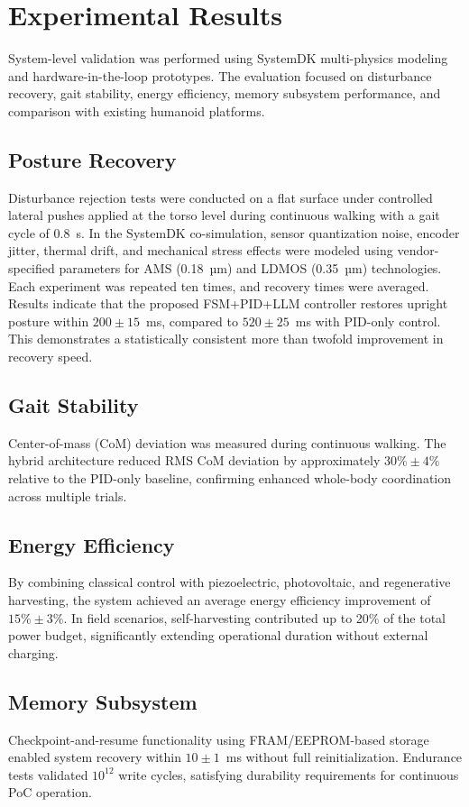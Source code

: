 \section{Experimental Results}
System-level validation was performed using SystemDK multi-physics modeling
and hardware-in-the-loop prototypes. The evaluation focused on disturbance recovery,
gait stability, energy efficiency, memory subsystem performance, and comparison
with existing humanoid platforms.

\subsection{Posture Recovery}
Disturbance rejection tests were conducted on a flat surface under controlled lateral pushes 
applied at the torso level during continuous walking with a gait cycle of 0.8~s. 
In the SystemDK co-simulation, sensor quantization noise, encoder jitter, thermal drift, 
and mechanical stress effects were modeled using vendor-specified parameters 
for AMS (0.18~µm) and LDMOS (0.35~µm) technologies. 
Each experiment was repeated ten times, and recovery times were averaged. 
Results indicate that the proposed FSM+PID+LLM controller
restores upright posture within $200 \pm 15$~ms,
compared to $520 \pm 25$~ms with PID-only control.
This demonstrates a statistically consistent more than twofold improvement in recovery speed.

\subsection{Gait Stability}
Center-of-mass (CoM) deviation was measured during continuous walking. 
The hybrid architecture reduced RMS CoM deviation by approximately $30\% \pm 4\%$
relative to the PID-only baseline, 
confirming enhanced whole-body coordination across multiple trials.

\subsection{Energy Efficiency}
By combining classical control with piezoelectric, photovoltaic, and regenerative harvesting,
the system achieved an average energy efficiency improvement of $15\% \pm 3\%$. 
In field scenarios, self-harvesting contributed up to 20\% of the total power budget,
significantly extending operational duration without external charging.

\subsection{Memory Subsystem}
Checkpoint-and-resume functionality using FRAM/EEPROM-based storage
enabled system recovery within $10 \pm 1$~ms without full reinitialization. 
Endurance tests validated $10^{12}$ write cycles,
satisfying durability requirements for continuous PoC operation.

